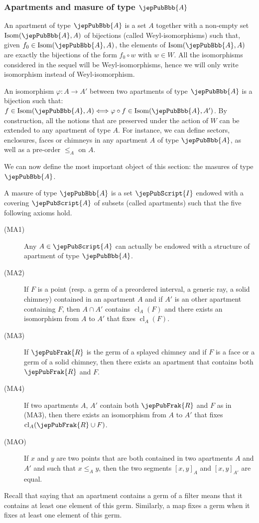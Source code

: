 \subsubsection{Apartments and masure of type \texorpdfstring{$\jepPubBbb{A}$}{A}}
An apartment of type $\jepPubBbb{A}$ is a set $A$ together with a non-empty set $\operatorname{Isom}(\jepPubBbb{A},A)$ of bijections (called Weyl-isomorphisms) such that, given $f_0\in\operatorname{Isom}(\jepPubBbb{A},A)$, the elements of $\operatorname{Isom}(\jepPubBbb{A},A)$ are exactly the bijections of the form $f_0\circ w$ with $w\in W$. All the isomorphisms considered in the sequel will be Weyl-isomorphisms, hence we will only write isomorphism instead of Weyl-isomorphism.

An isomorphism $\varphi:A\to A'$ between two apartments of type $\jepPubBbb{A}$ is a bijection such that: $f\in\operatorname{Isom}(\jepPubBbb{A},A)\Longleftrightarrow\varphi\circ f\in\operatorname{Isom}(\jepPubBbb{A},A')$. By construction, all the notions that are preserved under the action of $W$ can be extended to any apartment of type $A$. For instance, we can define sectors, enclosures, faces or chimneys in any apartment $A$ of type $\jepPubBbb{A}$, as well as a pre-order $\leqslant_A$ on $A$.

We can now define the most important object of this section: the masures of type $\jepPubBbb{A}$.
\begin{definition}\label{jep88localDefinition2_4}
A masure of type $\jepPubBbb{A}$ is a set $\jepPubScript{I}$ endowed with a covering $\jepPubScript{A}$ of subsets (called apartments) such that the five following axioms hold.
\begin{description}
\item[(MA1)] Any $A\in\jepPubScript{A}$ can actually be endowed with a structure of apartment of type $\jepPubBbb{A}$.
\item[(MA2)] If $F$ is a point (resp. a germ of a preordered interval, a generic ray, a solid chimney) contained in an apartment $A$ and if $A'$ is an other apartment containing $F$, then $A\cap A'$ contains $\operatorname{cl}_A(F)$ and there exists an isomorphism from $A$ to $A'$ that fixes $\operatorname{cl}_A(F)$.
\item[(MA3)] If $\jepPubFrak{R}$ is the germ of a splayed chimney and if $F$ is a face or a germ of a solid chimney, then there exists an apartment that contains both $\jepPubFrak{R}$ and $F$.
\item[(MA4)] If two apartments $A$, $A'$ contain both $\jepPubFrak{R}$ and $F$ as in (MA3), then there exists an isomorphism from $A$ to $A'$ that fixes $\operatorname{cl}_A(\jepPubFrak{R}\cup F)$.
\item[(MAO)] If $x$ and $y$ are two points that are both contained in two apartments $A$ and $A'$ and such that $x\leqslant_A y$, then the two segments $[x,y]_A$ and $[x,y]_{A'}$ are equal.
\end{description}
\end{definition}
Recall that saying that an apartment contains a germ of a filter means that it contains at least one element of this germ. Similarly, a map fixes a germ when it fixes at least one element of this germ.

